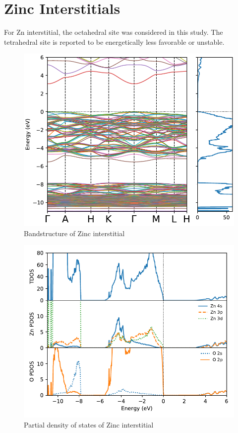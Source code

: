 \clearpage

\section{Zinc Interstitials}

For Zn interstitial, the octahedral site was considered in this study. The tetrahedral site is reported to be energetically less favorable or unstable. 

\begin{figure}[tbh!]
	\centering
	\includegraphics[width=0.6\linewidth]{"images/rnd/band-dos_Zn_i"}
	\caption[Bandstructure of Zinc interstitial]{Bandstructure of Zinc interstitial}
\end{figure}

\begin{figure}[tbh!]
	\centering
	\includegraphics[width=0.6\linewidth]{"images/rnd/dos-pdos_Zn_i"}
	\caption[Partial density of states of Zinc interstitial]{Partial density of states of Zinc interstitial}
\end{figure}


